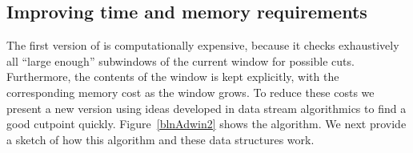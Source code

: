 
\subsection{Improving time and memory requirements}
\label{Sadwin2}
%
The first version of \adwinz is computationally expensive, 
because it checks exhaustively all ``large enough'' subwindows
of the current window for possible cuts. 
Furthermore, the contents of the window is kept explicitly, 
with the corresponding memory cost as the window grows. 
To reduce these costs we present a new version \adwintwo
using ideas developed in data stream algorithmics
\cite{BBD02,MUT03,babcock-sampling,datar02}
to find a good cutpoint quickly.
Figure~\ref{blnAdwin2} shows the \adwintwo algorithm.
 We next 
provide a sketch of how this algorithm and these data structures work. 


